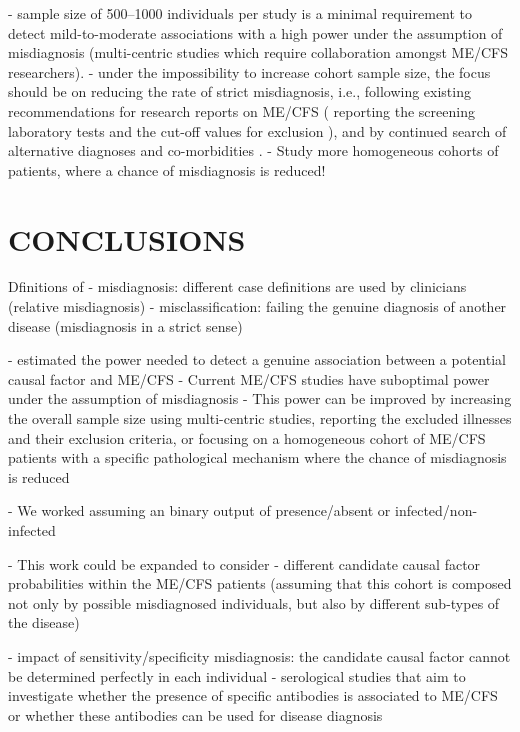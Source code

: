 - sample size of 500--1000 individuals per study is a minimal requirement to detect mild-to-moderate associations with a high power under the assumption of misdiagnosis (multi-centric studies which require collaboration amongst ME/CFS researchers).
- under the impossibility to increase cohort sample size, the focus should be on reducing the rate of strict misdiagnosis, i.e., following existing recommendations for research reports on ME/CFS ( reporting the screening laboratory tests and the cut-off values for exclusion \citep{jason2012MinimumData}), and by continued search of alternative diagnoses and co-morbidities \citep{nacul2021EuropeanNetwork}.
- Study more homogeneous cohorts of patients, where a chance of misdiagnosis is reduced!


\section{CONCLUSIONS}

Dfinitions of
    - misdiagnosis: different case definitions are used by clinicians (relative misdiagnosis)
    - misclassification: failing the genuine diagnosis of another disease (misdiagnosis in a strict sense)

- estimated the power needed to detect a genuine association between a potential causal factor and ME/CFS
- Current ME/CFS studies have suboptimal power under the assumption of misdiagnosis
- This power can be improved by increasing the overall sample size using multi-centric studies, reporting the excluded illnesses and their exclusion criteria, or focusing on a homogeneous cohort of ME/CFS patients with a specific pathological mechanism where the chance of misdiagnosis is reduced

- We worked assuming an binary output of presence/absent or infected/non-infected


- This work could be expanded to consider
    - different candidate causal factor probabilities within the ME/CFS patients (assuming that this cohort is composed not only by possible misdiagnosed individuals, but also by different sub-types of the disease)

- impact of sensitivity/specificity misdiagnosis: the candidate causal factor cannot be determined perfectly in each individual
    - serological studies that aim to investigate whether the presence of specific antibodies is associated to ME/CFS \citep{ruiz-pablos2021EpsteinBarrVirus} or whether these antibodies can be used for disease diagnosis \citep{sepulveda2022RevisitingIgG}

